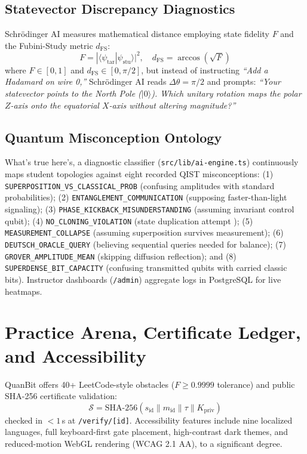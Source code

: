 \documentclass[conference]{IEEEtran}
\begin{document}
\subsection{Statevector Discrepancy Diagnostics}
Schr{\"o}dinger AI measures mathematical distance employing state fidelity $F$ and the Fubini-Study metric $d_{\text{FS}}$:
\begin{equation}
F = |\langle \psi_{\text{tar}} | \psi_{\text{stu}} \rangle|^2, \quad
d_{\text{FS}} = \arccos\left(\sqrt{F}\right)
\end{equation}
where $F \in [0, 1]$ and $d_{\text{FS}} \in [0, \pi/2]$, but instead of instructing \textit{``Add a Hadamard on wire 0,''} Schr{\"o}dinger AI reads $\Delta\theta = \pi/2$ and prompts: \textit{``Your statevector points to the North Pole ($|0\rangle$). Which unitary rotation maps the polar $Z$-axis onto the equatorial $X$-axis without altering magnitude?''}

\subsection{Quantum Misconception Ontology}
What's true here's, a diagnostic classifier (\texttt{src/lib/ai-engine.ts}) continuously maps student topologies against eight recorded QIST misconceptions:
(1) \texttt{SUPERPOSITION\_VS\_CLASSICAL\_PROB} (confusing amplitudes with standard probabilities);
(2) \texttt{ENTANGLEMENT\_COMMUNICATION} (supposing faster-than-light signaling);
(3) \texttt{PHASE\_KICKBACK\_MISUNDERSTANDING} (assuming invariant control qubit);
(4) \texttt{NO\_CLONING\_VIOLATION} (state duplication attempt \cite{b17});
(5) \texttt{MEASUREMENT\_COLLAPSE} (assuming superposition survives measurement);
(6) \texttt{DEUTSCH\_ORACLE\_QUERY} (believing sequential queries needed for balance);
(7) \texttt{GROVER\_AMPLITUDE\_MEAN} (skipping diffusion reflection); and
(8) \texttt{SUPERDENSE\_BIT\_CAPACITY} (confusing transmitted qubits with carried classic bits).
Instructor dashboards (\texttt{/admin}) aggregate logs in PostgreSQL for live heatmaps.

\section{Practice Arena, Certificate Ledger, and Accessibility}
\label{sec:practice_ledger}

QuanBit offers 40+ LeetCode-style obstacles ($F \ge 0.9999$ tolerance) and public SHA-256 certificate validation:
\begin{equation}
\mathcal{S} = \text{SHA-256}(s_{\text{id}} \parallel m_{\text{id}} \parallel \tau \parallel K_{\text{priv}})
\end{equation}
checked in $<1$\,s at \texttt{/verify/[id]}. Accessibility features include nine localized languages, full keyboard-first gate placement, high-contrast dark themes, and reduced-motion WebGL rendering (WCAG 2.1 AA), to a significant degree.
\end{document}
